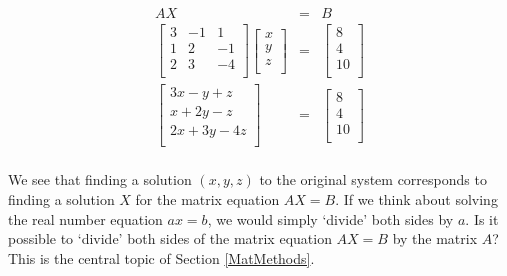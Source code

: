 \documentclass{ximera}
\begin{document}
\[ \begin{array}{rcl}

AX & = & B \\  
\left[ \begin{array}{rrr} 3 & -1 & 1  \\ 1 & 2 & -1  \\ 2 & 3 & -4  \\ \end{array} \right] \left[ \begin{array}{r}  x \\  y \\  z \\ \end{array} \right] & = & \left[ \begin{array}{r}  8 \\  4 \\  10 \\ \end{array} \right] \\  

\left[ \begin{array}{rrr} 3x -y +z  \\ x + 2y  -z  \\ 2x + 3y  -4 z \\ \end{array} \right] & = & \left[ \begin{array}{r}  8 \\  4 \\  10 \\ \end{array} \right] \\  

\end{array}\]

We see that finding a solution $(x,y,z)$ to the original system corresponds to finding a solution $X$ for the matrix equation $AX = B$.   If we think about solving the real number equation $ax = b$, we would simply `divide' both sides by $a$. Is it possible to `divide' both sides of the matrix equation $AX = B$ by the matrix $A$?    This is the central topic of Section \ref{MatMethods}. 



\closegraphsfile
\end{document}

